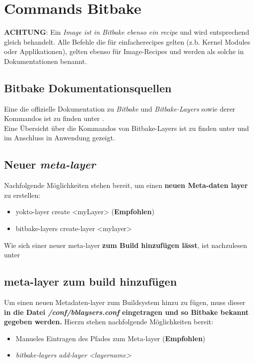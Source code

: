 \chapter{Commands Bitbake}%
\label{cha:commands_bitbake}

\textbf{ACHTUNG}: Ein \textit{Image ist in  Bitbake ebenso
ein \textit{recipe}} und wird entsprechend gleich behandelt. Alle Befehle die
für \glq einfache\grq recipes gelten (z.b. Kernel Modules oder Applikationen),
gelten ebenso für Image-Recipes und werden als solche in Dokumentationen benannt.


\section{Bitbake Dokumentationsquellen}%
\label{sec:bitbake_quellen}
Eine die offizielle Dokumentation zu \textit{Bitbake} und
\textit{Bitbake-Layers} sowie derer Kommandos ist zu finden unter
\cite{Yocto:Bitbake_Manual}.\\

Eine Übersicht über die Kommandos von Bitbake-Layers  ist zu finden unter
\cite[156]{Gonzalez2018:Embedded_Linux_Development_Using_Yocto_Project_Cookbook_2nd}
und im Anschluss in Anwendung gezeigt.


\section{Neuer \textit{meta-layer}}%
\label{sec:_a_new_recipes}
Nachfolgende Möglichkeiten stehen bereit, um einen \textbf{neuen Meta-daten
layer} zu erstellen:
\begin{itemize}
    \item yokto-layer create <myLayer> (\textbf{Empfohlen})
    \item bitbake-layers create-layer <mylayer>
\end{itemize}

Wie sich einer neuer meta-layer \textbf{zum Build hinzufügen lässt}, ist
nachzulesen unter 

\section{meta-layer zum build hinzufügen}%
\label{sec:meta_layer_zum_build_hinzufugen}
Um einen neuen Metadaten-layer zum Buildsystem hinzu zu fügen, muss dieser
\textbf{ in die Datei \textit{/conf/bblaysers.conf} eingetragen und so Bitbake
bekannt gegeben werden.} Hierzu stehen nachfolgende Möglichkeiten bereit:
\begin{itemize}
    \item Manueles Eintragen des Pfades zum Meta-layer (\textbf{Empfohlen})
    \item \textit{bitbake-layers add-layer <layername>}
\end{itemize}



